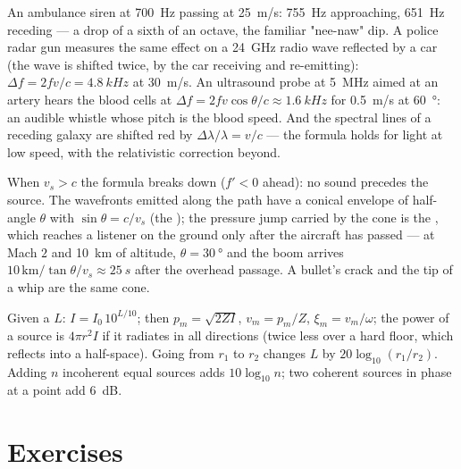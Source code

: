 \begin{example}\label{ex:b2:sound-waves:dopplerex}
An ambulance siren at \qty{700}{Hz} passing at \qty{25}{m/s}: \qty{755}{Hz}
approaching, \qty{651}{Hz} receding --- a drop of a sixth of an octave,
the familiar "nee-naw" dip. A police radar gun measures the same
effect on a \qty{24}{GHz} radio wave reflected by a car (the wave is
shifted twice, by the car receiving and re-emitting): $\Delta f = 2fv/c =
\qty{4.8}{kHz}$ at \qty{30}{m/s}. An ultrasound probe at \qty{5}{MHz} aimed at
an artery hears the blood cells at $\Delta f = 2fv\cos\theta/c \approx \qty{1.6}{kHz}$
for \qty{0.5}{m/s} at \qty{60}{\degree}: an audible whistle whose pitch is the
blood speed. And the spectral lines of a receding galaxy are shifted
red by $\Delta\lambda/\lambda = v/c$ --- the formula holds for light at low speed,
with the relativistic correction beyond.
\end{example}

\begin{remark}[Supersonic]\label{rem:b2:sound-waves:mach}
When $v_s > c$ the formula breaks down ($f' < 0$ ahead): no sound precedes
the source. The wavefronts emitted along the path have a conical
envelope of half-angle $\theta$ with $\sin\theta = c/v_s$ (the \emph{});
the pressure jump carried by the cone is the , which reaches
a listener on the ground only after the aircraft has passed --- at
Mach $2$ and \qty{10}{km} of altitude, $\theta = \qty{30}{\degree}$ and the boom
arrives $10\,\text{km}/\tan\theta/v_s \approx \qty{25}{s}$ after the overhead
passage. A bullet's crack and the tip of a whip are the same cone.
\end{remark}

\begin{method}\label{met:b2:sound-waves:method}
Given a  $L$: $I = I_0\,10^{L/10}$; then $p_m = \sqrt{2ZI}$,
$v_m = p_m/Z$, $\xi_m = v_m/\omega$; the power of a source is $4\pi r^2I$ if it
radiates in all directions (twice less over a hard floor, which
reflects into a half-space). Going from $r_1$ to $r_2$ changes $L$ by
$20\log_{10}(r_1/r_2)$. Adding $n$ incoherent equal sources adds
$10\log_{10}n$; two coherent sources in phase at a point add \qty{6}{dB}.
\end{method}

\section{Exercises}

